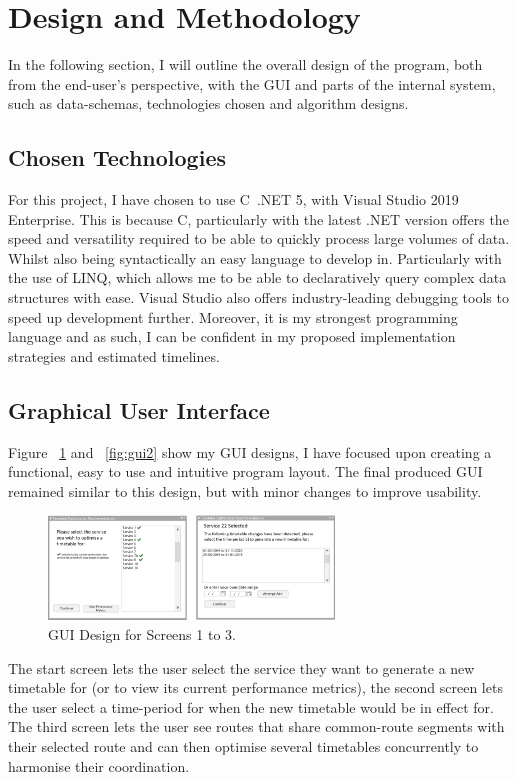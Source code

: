 \documentclass{article}
\newcommand{\CS}{C\nolinebreak\hspace{-.05em}\raisebox{.6ex}{\tiny\bf \#}}
\begin{document}
\section{Design and Methodology}

In the following section, I will outline the overall design of the program, both from the end-user's perspective, with the GUI and parts of the internal system, such as data-schemas, technologies chosen and algorithm designs.


\subsection{Chosen Technologies}
For this project, I have chosen to use \CS \ .NET 5, with Visual Studio 2019 Enterprise. This is because \CS, particularly with the latest .NET version offers the speed and versatility required to be able to quickly process large volumes of data. Whilst also being syntactically an easy language to develop in. Particularly with the use of LINQ, which allows me to be able to declaratively query complex data structures with ease. Visual Studio also offers industry-leading debugging tools to speed up development further. Moreover, it is my strongest programming language and as such, I can be confident in my proposed implementation strategies and estimated timelines.

\subsection{Graphical User Interface}

Figure ~\ref{fig:gui1} and ~\ref{fig:gui2} show my GUI designs, I have focused upon creating a functional, easy to use and intuitive program layout. The final produced GUI remained similar to this design, but with minor changes to improve usability.

\begin{figure}[H]
	\centering
	\includegraphics[height=105px]{images/GUI_1.png}
	\caption{GUI Design for Screens 1 to 3.}
	\label{fig:gui1}
\end{figure}

The start screen lets the user select the service they want to generate a new timetable for (or to view its current performance metrics), the second screen lets the user select a time-period for when the new timetable would be in effect for. The third screen lets the user see routes that share common-route segments with their selected route and can then optimise several timetables concurrently to harmonise their coordination. 
\end{document}
